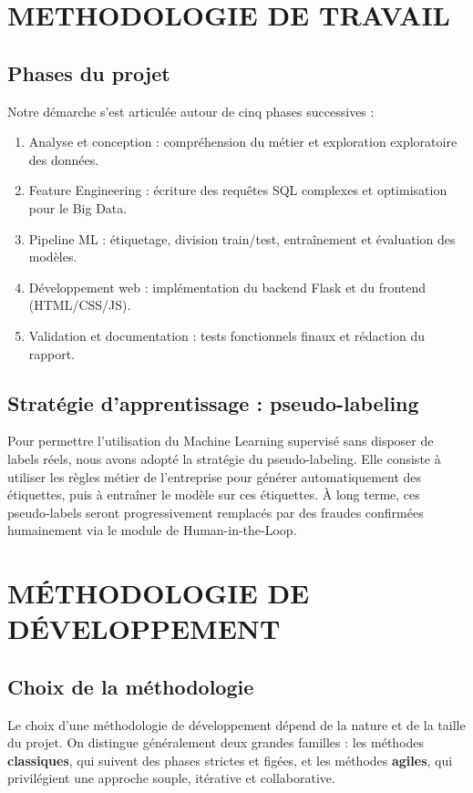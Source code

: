 \documentclass[12pt, oneside, a4paper]{report}
\begin{document}
\section{METHODOLOGIE DE TRAVAIL}

\subsection{Phases du projet}
Notre démarche s'est articulée autour de cinq phases successives :
\begin{enumerate}
\item Analyse et conception : compréhension du métier et exploration exploratoire des données.
\item Feature Engineering : écriture des requêtes SQL complexes et optimisation pour le Big Data.
\item Pipeline ML : étiquetage, division train/test, entraînement et évaluation des modèles.
\item Développement web : implémentation du backend Flask et du frontend (HTML/CSS/JS).
\item Validation et documentation : tests fonctionnels finaux et rédaction du rapport.
\end{enumerate}

\subsection{Stratégie d'apprentissage : pseudo-labeling}
Pour permettre l'utilisation du Machine Learning supervisé sans disposer de labels réels, nous avons adopté la stratégie du pseudo-labeling. Elle consiste à utiliser les règles métier de l'entreprise pour générer automatiquement des étiquettes, puis à entraîner le modèle sur ces étiquettes. À long terme, ces pseudo-labels seront progressivement remplacés par des fraudes confirmées humainement via le module de Human-in-the-Loop.

\section{MÉTHODOLOGIE DE DÉVELOPPEMENT}

\subsection{Choix de la méthodologie}
Le choix d'une méthodologie de développement dépend de la nature et de la taille du projet. On distingue généralement deux grandes familles : les méthodes \textbf{classiques}, qui suivent des phases strictes et figées, et les méthodes \textbf{agiles}, qui privilégient une approche souple, itérative et collaborative.
\end{document}
